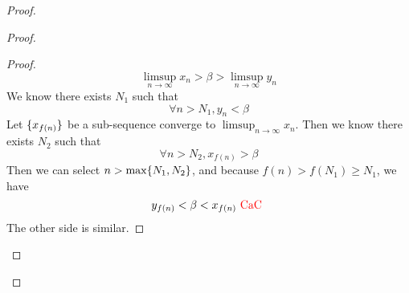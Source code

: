 \documentclass{report}
\begin{document}
\begin{proof}
\begin{proof}
\begin{proof}
\begin{equation}
\limsup_{n\to\infty} x_n>\beta >\limsup_{n\to\infty} y_n
\end{equation}
We know there exists $N_1$ such that
 \begin{equation}
\forall n>N_1, y_n<\beta 
\end{equation}
Let $\{ x_{f(n)} \}$ be a sub-sequence converge to $\limsup_{n\to\infty} x_n$. Then we know there exists $N_2$ such that
 \begin{equation}
\forall n>N_2, x_{f(n)}>\beta 
\end{equation}
Then we can select $n>\max \{ N_1,N_2 \}$, and because $f(n)>f(N_1)\geq N_1$, we have
\begin{equation}
y_{f(n)}<\beta <x_{f(n)}\text{ \textcolor{red}{CaC} }
\end{equation}
The other side is similar.
\end{proof}

\end{proof}
\end{proof}
\end{document}
